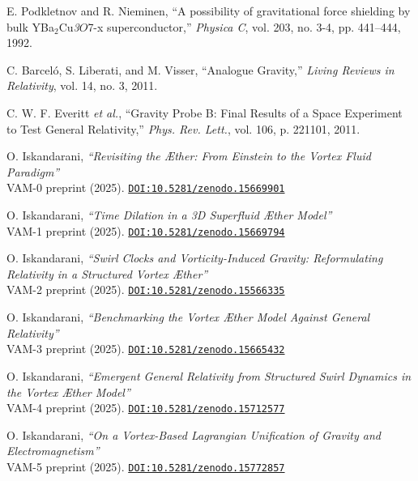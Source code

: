 \documentclass[twocolumn,aps,pre,floatfix,nofootinbib]{revtex4-2}
\begin{document}
\begin{thebibliography}{99}

    E. Podkletnov and R. Nieminen, “A possibility of gravitational force shielding by bulk YBa$_2$Cu\textit{3$O$}{7-x} superconductor,” \emph{Physica C}, vol. 203, no. 3-4, pp. 441–444, 1992.

    C. Barceló, S. Liberati, and M. Visser, “Analogue Gravity,” \emph{Living Reviews in Relativity}, vol. 14, no. 3, 2011.

    C. W. F. Everitt \emph{et al.}, “Gravity Probe B: Final Results of a Space Experiment to Test General Relativity,” \emph{Phys. Rev. Lett.}, vol. 106, p. 221101, 2011.


    \label{VAM-0}
    O. Iskandarani,
    \emph{“Revisiting the Æther:  From Einstein to the Vortex Fluid Paradigm”}\\
    {\scriptsize VAM-0 preprint (2025).
    \href{https://doi.org/10.5281/zenodo.15669901}{\texttt{DOI:10.5281/zenodo.15669901}}}


    \label{VAM-1}
    O. Iskandarani,
    \emph{“Time Dilation in a 3D Superfluid Æther Model”}\\
    {\scriptsize VAM-1 preprint (2025).
    \href{https://doi.org/10.5281/zenodo.15669794}{\texttt{DOI:10.5281/zenodo.15669794}}}

    \label{VAM-2}
    O. Iskandarani,
    \emph{“Swirl Clocks and Vorticity-Induced Gravity: Reformulating Relativity in a Structured Vortex Æther”}\\
    {\scriptsize VAM-2 preprint (2025).
    \href{https://doi.org/10.5281/zenodo.15566335}{\texttt{DOI:10.5281/zenodo.15566335}}}

    \label{VAM-3}
    O. Iskandarani,
    \emph{“Benchmarking the Vortex Æther Model Against General Relativity”}\\
    {\scriptsize VAM-3 preprint (2025).
    \href{https://doi.org/10.5281/zenodo.15665432}{\texttt{DOI:10.5281/zenodo.15665432}}}

    \label{VAM-4}
    O. Iskandarani,
    \emph{“Emergent General Relativity from Structured Swirl Dynamics in the Vortex Æther Model”}\\
    {\scriptsize VAM-4 preprint (2025).
    \href{https://doi.org/10.5281/zenodo.15712577}{\texttt{DOI:10.5281/zenodo.15712577}}}

    \label{VAM-5}
    O. Iskandarani,
    \emph{“On a Vortex-Based Lagrangian Unification of Gravity and Electromagnetism”}\\
    {\scriptsize VAM-5 preprint (2025).
    \href{https://doi.org/10.5281/zenodo.15772857}{\texttt{DOI:10.5281/zenodo.15772857}}}


\end{thebibliography}
\end{document}
